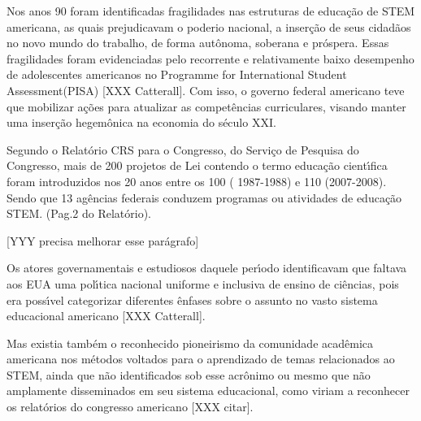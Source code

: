 \documentclass[
12pt,		%
openright,	%
twoside,  %
a4paper,			%
chapter=TITLE,		%
english,			%
french,				%
spanish,			%
brazil				%
]{USPSC-classe/USPSC}
\begin{document}
Nos anos 90 foram identificadas fragilidades nas estruturas de educa\c{c}\~ao de STEM americana, as quais prejudicavam  o \textquotedbl poderio nacional\textquotedbl , a inser\c{c}\~ao de seus cidad\~aos no novo mundo do trabalho, de forma aut\^onoma, soberana  e pr\'ospera. Essas fragilidades foram evidenciadas pelo recorrente e relativamente baixo desempenho de adolescentes americanos no \textquotedbl Programme for International Student Assessment\textquotedbl  (PISA) [XXX Catterall]. Com isso, o governo federal americano teve que mobilizar a\c{c}\~oes para atualizar as compet\^encias curriculares, visando manter uma inser\c{c}\~ao hegem\^onica na economia do s\'eculo XXI.














Segundo o Relat\'orio CRS para o Congresso, do Servi\c{c}o de Pesquisa do Congresso, mais de 200 projetos de Lei contendo o termo \textquotedbl  educa\c{c}\~ao cient\'{\i}fica \textquotedbl  foram introduzidos nos 20 anos entre os 100 ( 1987-1988) e 110 (2007-2008). Sendo que 13 ag\^encias federais conduzem programas ou atividades de educa\c{c}\~ao STEM. (Pag.2 do Relat\'orio). 














[YYY precisa melhorar esse par\'agrafo]














Os atores governamentais e estudiosos daquele per\'{\i}odo identificavam que faltava aos EUA uma pol\'{\i}tica nacional uniforme e inclusiva de ensino de ci\^encias, pois era poss\'{\i}vel categorizar diferentes \^enfases sobre o assunto no vasto sistema educacional americano [XXX Catterall].














Mas existia tamb\'em o reconhecido pioneirismo da comunidade acad\^emica americana nos m\'etodos voltados para o aprendizado de temas relacionados ao STEM, ainda que n\~ao identificados sob esse acr\^onimo ou mesmo que n\~ao amplamente disseminados em seu sistema educacional, como viriam a reconhecer os relat\'orios do congresso americano [XXX citar]. 
\end{document}
